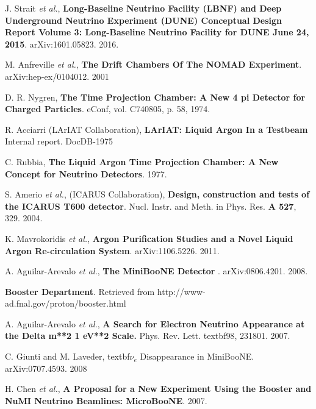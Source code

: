  J. Strait \textit{et al.}, \textbf{Long-Baseline Neutrino Facility (LBNF) and Deep Underground Neutrino Experiment (DUNE) Conceptual Design Report Volume 3: Long-Baseline Neutrino Facility for DUNE June 24, 2015}. arXiv:1601.05823. 2016.

 M. Anfreville \textit{et al.}, \textbf{The Drift Chambers Of The NOMAD Experiment}. 	arXiv:hep-ex/0104012. 2001

 D. R. Nygren, \textbf{The Time Projection Chamber: A New 4 pi Detector for Charged Particles}. eConf, vol. C740805, p. 58, 1974.

 R. Acciarri (LArIAT Collaboration), \textbf{LArIAT:
Liquid Argon In a Testbeam} Internal report. DocDB-1975

 C. Rubbia, \textbf{The Liquid Argon Time Projection Chamber: A New Concept for Neutrino Detectors}. 1977.

 S. Amerio \textit{et al.}, (ICARUS Collaboration), \textbf{Design, construction and tests of the ICARUS T600 detector}. Nucl. Instr. and Meth. in Phys. Res. \textbf{A 527}, 329. 2004.

 K. Mavrokoridis \textit{et al.}, \textbf{Argon Purification Studies and a Novel Liquid Argon Re-circulation System}. arXiv:1106.5226. 2011.	

 A. Aguilar-Arevalo \textit{et al.}, \textbf{The MiniBooNE Detector
}. arXiv:0806.4201. 2008.

 \textbf{Booster Department}. Retrieved from http://www-ad.fnal.gov/proton/booster.html

 A. Aguilar-Arevalo \textit{et al.}, \textbf{A Search for Electron Neutrino Appearance at the Delta m**2 1 eV**2 Scale.} Phys. Rev. Lett. textbf{98}, 231801. 2007. 

 C. Giunti and M. Laveder, textbf{$\nu_e$ Disappearance in MiniBooNE}. arXiv:0707.4593. 2008


 H. Chen \textit{et al.}, \textbf{A Proposal for a New Experiment Using the Booster and NuMI Neutrino Beamlines: MicroBooNE}. 2007.



